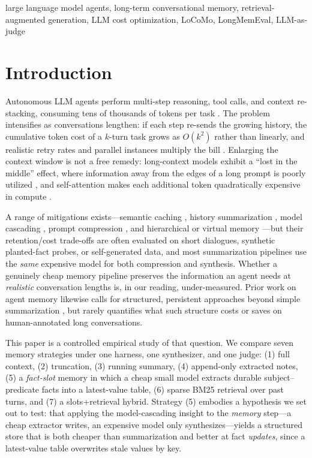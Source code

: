 \documentclass[conference]{IEEEtran}
\begin{document}
\begin{IEEEkeywords}
large language model agents, long-term conversational memory, retrieval-augmented generation, LLM cost optimization, LoCoMo, LongMemEval, LLM-as-judge
\end{IEEEkeywords}

\section{Introduction}

Autonomous LLM agents perform multi-step reasoning, tool calls, and context re-stacking, consuming tens of thousands of tokens per task \cite{zhou2024agents, park2023generative}. The problem intensifies as conversations lengthen: if each step re-sends the growing history, the cumulative token cost of a $k$-turn task grows as $O(k^2)$ rather than linearly, and realistic retry rates and parallel instances multiply the bill \cite{shinn2023reflexion}. Enlarging the context window is not a free remedy: long-context models exhibit a ``lost in the middle'' effect, where information away from the edges of a long prompt is poorly utilized \cite{nfliu2023lost}, and self-attention makes each additional token quadratically expensive in compute \cite{packer2023memgpt}.

A range of mitigations exists---semantic caching \cite{bang2023gptcache}, history summarization \cite{acl2024}, model cascading \cite{chen2023frugalgpt}, prompt compression \cite{jiang2023llmlingua}, and hierarchical or virtual memory \cite{packer2023memgpt}---but their retention/cost trade-offs are often evaluated on short dialogues, synthetic planted-fact probes, or self-generated data, and most summarization pipelines use the \emph{same} expensive model for both compression and synthesis. Whether a genuinely cheap memory pipeline preserves the information an agent needs at \emph{realistic} conversation lengths is, in our reading, under-measured. Prior work on agent memory likewise calls for structured, persistent approaches beyond simple summarization \cite{park2023generative, zhong2024memorybank, zhang2024memorysurvey}, but rarely quantifies what such structure costs or saves on human-annotated long conversations.

This paper is a controlled empirical study of that question. We compare seven memory strategies under one harness, one synthesizer, and one judge: (1) full context, (2) truncation, (3) running summary, (4) append-only extracted notes, (5) a \emph{fact-slot} memory in which a cheap small model extracts durable subject--predicate facts into a latest-value table, (6) sparse BM25 retrieval over past turns, and (7) a slots+retrieval hybrid. Strategy (5) embodies a hypothesis we set out to test: that applying the model-cascading insight \cite{chen2023frugalgpt} to the \emph{memory} step---a cheap extractor writes, an expensive model only synthesizes---yields a structured store that is both cheaper than summarization and better at fact \emph{updates}, since a latest-value table overwrites stale values by key.
\end{document}
